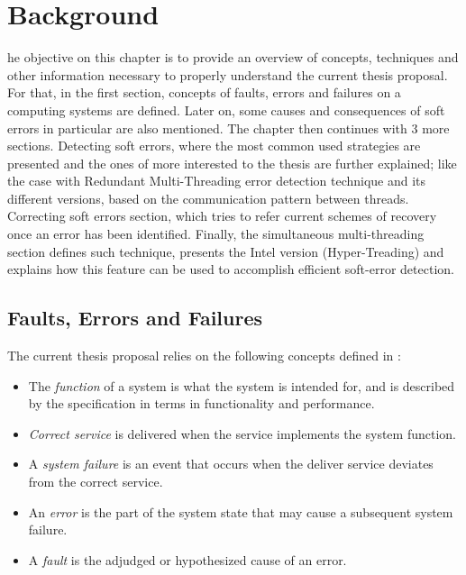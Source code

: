 %
%
\let\textcircled=\pgftextcircled
\chapter{Background}
\label{chap:background}
he objective on this chapter is to provide an overview of concepts, techniques and other information necessary to properly understand the current thesis proposal. For that, in the first section, concepts of faults, errors and failures on a computing systems are defined. Later on, some causes and consequences of soft errors in particular are also mentioned. The chapter then continues with 3 more sections. Detecting soft errors, where the most common used strategies are presented and the ones of more interested to the thesis are further explained; like the case with Redundant Multi-Threading error detection technique and its different versions, based on the communication pattern between threads. Correcting soft errors section, which tries to refer current schemes of recovery once an error has been identified. Finally, the simultaneous multi-threading section defines such technique, presents the Intel version (Hyper-Treading) and explains how this feature can be used to accomplish efficient soft-error detection. 

\section{Faults, Errors and Failures}
\label{sec:FaultsErrorsFailures}
The current thesis proposal relies on the following concepts defined in \cite{avizienisLaprie2004basic}: 

\begin{itemize}
	\item The \textit{function} of a system is what the system is intended for, and is described by the specification in terms in functionality and performance. 
    \item \textit{Correct service} is delivered when the service implements the system function. 
    \item A \textit{system failure} is an event that occurs when the deliver service deviates from the correct service. 
    \item An \textit{error} is the part of the system state that may cause a subsequent system failure. 
    \item A \textit{fault} is the adjudged or hypothesized cause of an error. 
\end{itemize}

